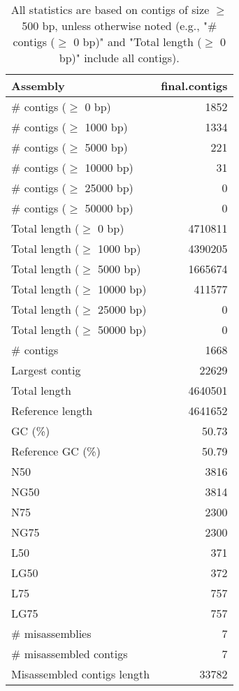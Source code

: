 \documentclass[12pt,a4paper]{article}
\begin{document}
\begin{table}[ht]
\begin{center}
\caption{All statistics are based on contigs of size $\geq$ 500 bp, unless otherwise noted (e.g., "\# contigs ($\geq$ 0 bp)" and "Total length ($\geq$ 0 bp)" include all contigs).}
\begin{tabular}{|l*{1}{|r}|}
\hline
Assembly & final.contigs \\ \hline
\# contigs ($\geq$ 0 bp) & 1852 \\ \hline
\# contigs ($\geq$ 1000 bp) & 1334 \\ \hline
\# contigs ($\geq$ 5000 bp) & 221 \\ \hline
\# contigs ($\geq$ 10000 bp) & 31 \\ \hline
\# contigs ($\geq$ 25000 bp) & 0 \\ \hline
\# contigs ($\geq$ 50000 bp) & 0 \\ \hline
Total length ($\geq$ 0 bp) & 4710811 \\ \hline
Total length ($\geq$ 1000 bp) & 4390205 \\ \hline
Total length ($\geq$ 5000 bp) & 1665674 \\ \hline
Total length ($\geq$ 10000 bp) & 411577 \\ \hline
Total length ($\geq$ 25000 bp) & 0 \\ \hline
Total length ($\geq$ 50000 bp) & 0 \\ \hline
\# contigs & 1668 \\ \hline
Largest contig & 22629 \\ \hline
Total length & 4640501 \\ \hline
Reference length & 4641652 \\ \hline
GC (\%) & 50.73 \\ \hline
Reference GC (\%) & 50.79 \\ \hline
N50 & 3816 \\ \hline
NG50 & 3814 \\ \hline
N75 & 2300 \\ \hline
NG75 & 2300 \\ \hline
L50 & 371 \\ \hline
LG50 & 372 \\ \hline
L75 & 757 \\ \hline
LG75 & 757 \\ \hline
\# misassemblies & 7 \\ \hline
\# misassembled contigs & 7 \\ \hline
Misassembled contigs length & 33782 \\ \hline

\end{tabular}
\end{center}
\end{table}
\end{document}
